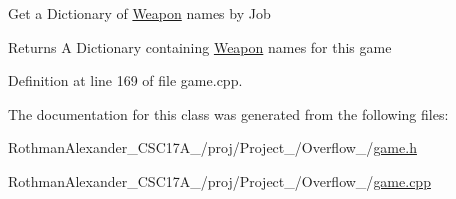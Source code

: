 Get a Dictionary of \hyperlink{class_flow_1_1_weapon}{Weapon} names by Job \begin{DoxyReturn}{Returns}
A Dictionary containing \hyperlink{class_flow_1_1_weapon}{Weapon} names for this game 
\end{DoxyReturn}


Definition at line 169 of file game.\+cpp.



The documentation for this class was generated from the following files\+:\begin{DoxyCompactItemize}
\item 
Rothman\+Alexander\+\_\+\+C\+S\+C17\+A\+\_/proj/\+Project\+\_/\+Overflow\+\_/\hyperlink{game_8h}{game.\+h}\item 
Rothman\+Alexander\+\_\+\+C\+S\+C17\+A\+\_/proj/\+Project\+\_/\+Overflow\+\_/\hyperlink{game_8cpp}{game.\+cpp}\end{DoxyCompactItemize}
